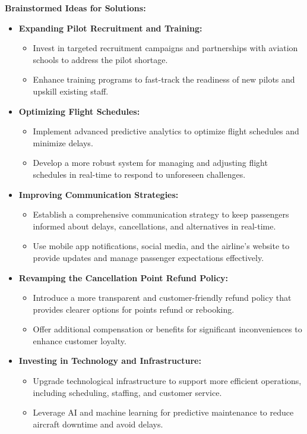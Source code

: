 \documentclass[12pt,a4paper]{article}
\begin{document}
\noindent\textbf{Brainstormed Ideas for Solutions: }
\begin{itemize}
  \item \textbf{Expanding Pilot Recruitment and Training:} 
    \begin{itemize}
      \item Invest in targeted recruitment campaigns and partnerships with aviation schools to address the pilot shortage. 
      \item Enhance training programs to fast-track the readiness of new pilots and upskill existing staff. 
    \end{itemize}
  \item \textbf{Optimizing Flight Schedules:} 
    \begin{itemize}
      \item Implement advanced predictive analytics to optimize flight schedules and minimize delays.
      \item Develop a more robust system for managing and adjusting flight schedules in real-time to respond to unforeseen challenges. 
    \end{itemize}
    \item \textbf{Improving Communication Strategies:} 
    \begin{itemize}
      \item Establish a comprehensive communication strategy to keep passengers informed about delays, cancellations, and alternatives in real-time. 
      \item Use mobile app notifications, social media, and the airline's website to provide updates and manage passenger expectations effectively. 
    \end{itemize}
    \item \textbf{Revamping the Cancellation Point Refund Policy:} 
    \begin{itemize}
      \item Introduce a more transparent and customer-friendly refund policy that provides clearer options for points refund or rebooking.
      \item Offer additional compensation or benefits for significant inconveniences to enhance customer loyalty. 
    \end{itemize}
    \item \textbf{Investing in Technology and Infrastructure:}  
    \begin{itemize}
      \item Upgrade technological infrastructure to support more efficient operations, including scheduling, staffing, and customer service.
      \item Leverage AI and machine learning for predictive maintenance to reduce aircraft downtime and avoid delays. 
    \end{itemize}
\end{itemize}
 
\end{document}
